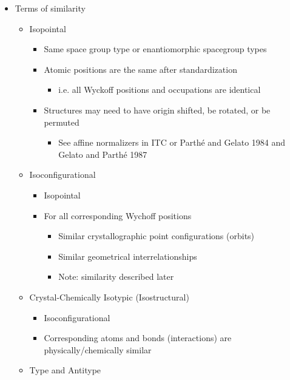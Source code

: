 \documentclass[11pt]{article}
\providecommand{\tightlist}{%
      \setlength{\itemsep}{0pt}\setlength{\parskip}{0pt}}
\begin{document}
\begin{itemize}
\tightlist
\item
  Terms of similarity

  \begin{itemize}
  \tightlist
  \item
    Isopointal

    \begin{itemize}
    \tightlist
    \item
      Same space group type or enantiomorphic spacegroup types
    \item
      Atomic positions are the same after standardization

      \begin{itemize}
      \tightlist
      \item
        i.e. all Wyckoff positions and occupations are identical
      \end{itemize}
    \item
      Structures may need to have origin shifted, be rotated, or be
      permuted

      \begin{itemize}
      \tightlist
      \item
        See affine normalizers in ITC or Parthé and Gelato 1984 and
        Gelato and Parthé 1987
      \end{itemize}
    \end{itemize}
  \item
    Isoconfigurational

    \begin{itemize}
    \tightlist
    \item
      Isopointal
    \item
      For all corresponding Wychoff positions

      \begin{itemize}
      \tightlist
      \item
        Similar crystallographic point configurations (orbits)
      \item
        Similar geometrical interrelationships
      \item
        Note: similarity described later
      \end{itemize}
    \end{itemize}
  \item
    Crystal-Chemically Isotypic (Isostructural)

    \begin{itemize}
    \tightlist
    \item
      Isoconfigurational
    \item
      Corresponding atoms and bonds (interactions) are
      physically/chemically similar
    \end{itemize}
  \item
    Type and Antitype


\end{itemize}
\end{itemize}
\end{document}
